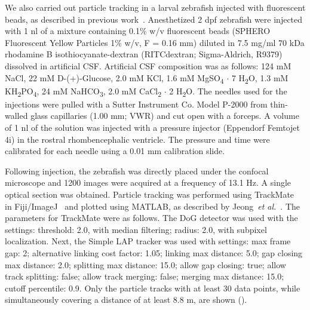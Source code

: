 \documentclass{WileyMSP-template}
\begin{document}
We also carried out
particle tracking in a larval zebrafish injected with fluorescent beads, as described in previous work~\cite{Olstad2019CiliaryDevelopment}.
Anesthetized 2 dpf zebrafish were injected with 1 nl of a mixture containing 0.1\% w/v fluorescent beads
(SPHERO Fluorescent Yellow Particles 1\% w/v, F = 0.16 mm) diluted
in 7.5 mg/ml 70 kDa rhodamine B isothiocyanate-dextran (RITCdextran; Sigma-Aldrich, R9379)
dissolved in artificial CSF. Artificial CSF composition was as follows:
124 mM NaCl, 22 mM D-(+)-Glucose, 2.0 mM KCl, 1.6 mM MgSO\textsubscript{4} $\cdot$ 7 H\textsubscript{2}O,
1.3 mM KH\textsubscript{2}PO\textsubscript{4}, 24 mM NaHCO\textsubscript{3},
2.0 mM CaCl\textsubscript{2} $\cdot$ 2 H\textsubscript{2}O.
The needles used for the injections were pulled with a
Sutter Instrument Co. Model P-2000 from thin-walled glass
capillaries (1.00 mm; VWR) and cut open with a forceps.
A volume of 1 nl of the solution was injected with a pressure injector
(Eppendorf Femtojet 4i) in the rostral rhombencephalic ventricle.
The pressure and time were calibrated for each needle using a 0.01 mm calibration slide.

Following injection, the zebrafish was directly placed under the confocal
microscope and 1200 images were acquired at a frequency of 13.1 Hz.
A single optical section was obtained. Particle tracking was performed using
TrackMate~\cite{Tinevez2017TrackMate:Tracking} in Fiji/ImageJ~\cite{Schindelin2012Fiji:Analysis}
and plotted using MATLAB, as described by Jeong~\emph{et al.}~\cite{Jeong2022MeasurementTelencephalon}.
The parameters for TrackMate were as follows.
The DoG detector was used with the settings: threshold: 2.0, with
median filtering; radius: 2.0, with subpixel localization.
Next, the Simple LAP tracker was used with settings: max frame gap: 2;
alternative linking cost factor: 1.05; linking max distance: 5.0; gap closing max distance: 2.0;
splitting max distance: 15.0; allow gap closing: true; allow track splitting:
false; allow track merging: false; merging max distance: 15.0; cutoff percentile: 0.9.
Only the particle tracks with at least 30 data points, while simultaneously
covering a distance of at least 8.8 \textmu m, are shown ().
\end{document}
